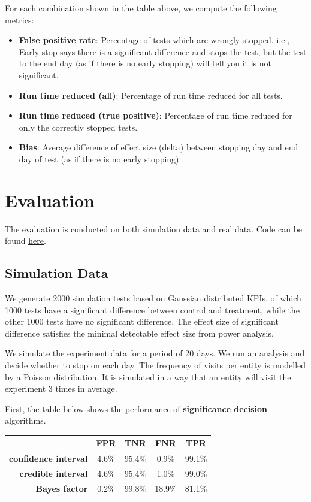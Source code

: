 \documentclass[paper=a4, fontsize=11pt]{scrartcl} %
\numberwithin{equation}{section} %
\numberwithin{figure}{section} %
\numberwithin{table}{section} %
\begin{document}
For each combination shown in the table above, we compute the following metrics:
\begin{itemize}[noitemsep]
\item \textbf{False positive rate}: Percentage of tests which are wrongly stopped. i.e., Early stop says there is a significant difference and stops the test, but the test to the end day (as if there is no early stopping) will tell you it is not significant.
\item \textbf{Run time reduced (all)}: Percentage of run time reduced for all tests.
\item \textbf{Run time reduced (true positive)}: Percentage of run time reduced for only the correctly stopped tests.
\item \textbf{Bias}: Average difference of effect size (delta) between stopping day and end day of test (as if there is no early stopping).
\end{itemize}

\section{Evaluation}

The evaluation is conducted on both simulation data and real data. Code can be found \href{https://github.com/shansfolder/ABTestingEarlyStoppingEvaluation}{\underline{here}}.

\subsection{Simulation Data}
We generate 2000 simulation tests based on Gaussian distributed KPIs, of which 1000 tests have a significant difference between control and treatment, while the other 1000 tests have no significant difference. The effect size of significant difference satisfies the minimal detectable effect size from power analysis. 

We simulate the experiment data for a period of 20 days. We run an analysis and decide whether to stop on each day. The frequency of visits per entity is modelled by a Poisson distribution. It is simulated in a way that an entity will visit the experiment 3 times in average. 

First, the table below shows the performance of \textbf{significance decision} algorithms.

\begin{center}
  \begin{tabular}{ | r | c | c | c | c | }
    \hline
    & FPR & TNR & FNR & TPR \\ \hline
    \textbf{confidence interval} & 4.6\% & 95.4\% & 0.9\% & 99.1\% \\ \hline
    \textbf{credible interval} & 4.6\% & 95.4\% & 1.0\% & 99.0\% \\ \hline
    \textbf{Bayes factor} & 0.2\% & 99.8\% & 18.9\% & 81.1\%\\
    \hline
  \end{tabular}
\end{center}
\end{document}

